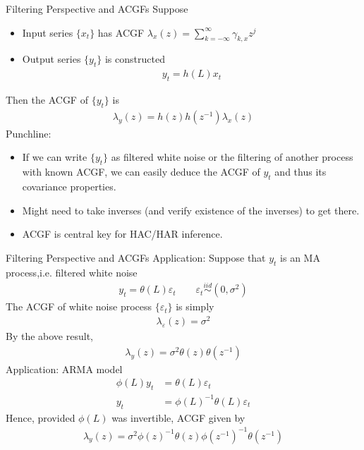 \documentclass[aspectratio=169, handout]{beamer}
\newcommand{\iid}{\overset{iid}{\sim}}
\begin{document}
{\footnotesize
\begin{frame}{Filtering Perspective and ACGFs}
Suppose
\begin{itemize}
  \item Input series $\{x_t\}$ has ACGF
    $\lambda_x(z)=\sum_{k=-\infty}^\infty \gamma_{k,x} z^j$
  \item Output series $\{y_t\}$ is constructed
    \begin{align*}
      y_t = h(L)x_t
    \end{align*}
\end{itemize}
Then the ACGF of $\{y_t\}$ is
\begin{align*}
  \lambda_y(z) = h(z)h(z^{-1})\lambda_x(z)
\end{align*}
\alert{Punchline}:
\begin{itemize}
  \item If we can write $\{y_t\}$ as filtered white noise or the
    filtering of another process with known ACGF, we can easily deduce
    the ACGF of $y_t$ and thus its covariance properties.

  \item Might need to take inverses (and verify existence of the
    inverses) to get there.

  \item ACGF is central key for HAC/HAR inference.
\end{itemize}
\end{frame}
}


{\footnotesize
\begin{frame}{Filtering Perspective and ACGFs}
\alert{Application}:
Suppose that $y_t$ is an MA process,i.e. filtered white noise
\begin{align*}
  y_t = \theta(L)\varepsilon_t
  \qquad
  \varepsilon_t
  \iid
  (0,\sigma^2)
\end{align*}
The ACGF of white noise process $\{\varepsilon_t\}$ is simply
\begin{align*}
  \lambda_\varepsilon(z) = \sigma^2
\end{align*}
By the above result,
\begin{align*}
  \lambda_y(z) = \sigma^2 \theta(z)\theta(z^{-1})
\end{align*}
\pause
\alert{Application}:
ARMA model
\begin{align*}
  \phi(L)y_t
  &=
  \theta(L)\varepsilon_t
  \\
  y_t
  &=
  \phi(L)^{-1}\theta(L)\varepsilon_t
\end{align*}
Hence, provided $\phi(L)$ was invertible, ACGF given by
\begin{align*}
  \lambda_y(z)
  =
  \sigma^2
  \phi(z)^{-1}\theta(z)
  \phi(z^{-1})^{-1}\theta(z^{-1})
\end{align*}
\end{frame}
}
\end{document}
